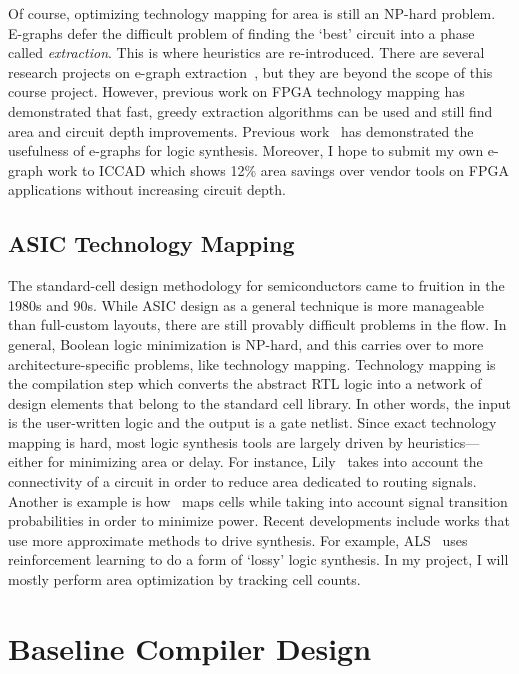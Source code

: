 \documentclass[10pt,letterpaper]{article}
\begin{document}
Of course, optimizing technology mapping for area is still an NP-hard problem.
E-graphs defer the difficult problem of finding the `best' circuit into a phase
called \textit{extraction}. This is where heuristics are re-introduced. There
are several research projects on e-graph
extraction~\cite{smoothe,sparsextract}, but they are beyond the scope of this
course project. However, previous work on FPGA technology mapping has
demonstrated that fast, greedy extraction algorithms can be used and still find
area and circuit depth improvements. Previous work~\cite{esyn} has demonstrated
the usefulness of e-graphs for logic synthesis. Moreover, I hope to submit my
own e-graph work to ICCAD which shows 12\% area savings over vendor tools on
FPGA applications without increasing circuit depth.

\subsection{ASIC Technology Mapping}\label{sec:background:techmapping}

The standard-cell design methodology for semiconductors came to fruition in the
1980s and 90s. While ASIC design as a general technique is more manageable than
full-custom layouts, there are still provably difficult problems in the flow.
In general, Boolean logic minimization is NP-hard, and this carries over to
more architecture-specific problems, like technology mapping. Technology
mapping is the compilation step which converts the abstract RTL logic into a
network of design elements that belong to the standard cell library. In other
words, the input is the user-written logic and the output is a gate netlist.
Since exact technology mapping is hard, most logic synthesis tools are largely
driven by heuristics---either for minimizing area or delay. For instance,
Lily~\cite{areamap} takes into account the connectivity of a circuit in order
to reduce area dedicated to routing signals. Another is example is
how~\cite{powermap} maps cells while taking into account signal transition
probabilities in order to minimize power. Recent developments include works
that use more approximate methods to drive synthesis. For example,
ALS~\cite{approxmap} uses reinforcement learning to do a form of `lossy' logic
synthesis. In my project, I will mostly perform area optimization by tracking
cell counts.

\section{Baseline Compiler Design}\label{sec:baseline}
\end{document}
